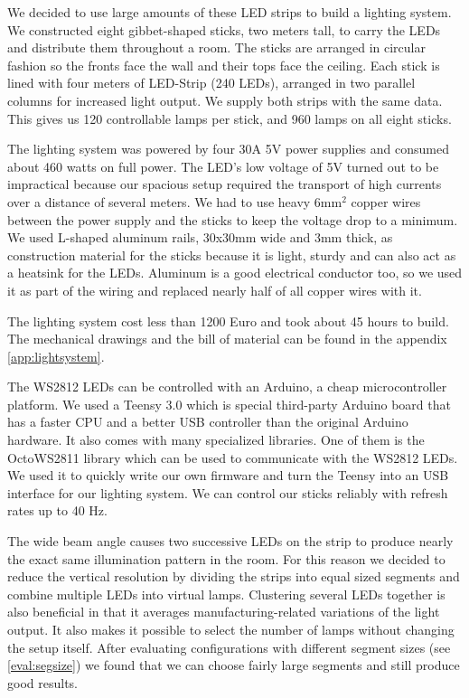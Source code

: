 We decided to use large amounts of these LED strips to build a lighting system.
We constructed eight gibbet-shaped sticks, two meters tall, to carry the LEDs and distribute them throughout a room.
The sticks are arranged in circular fashion so the fronts face the wall and their tops face the ceiling.
Each stick is lined with four meters of LED-Strip (240 LEDs), arranged in two parallel columns for increased light output.
We supply both strips with the same data. This gives us 120 controllable lamps per stick, and 960 lamps on all eight sticks.

The lighting system was powered by four 30A 5V power supplies and consumed about 460 watts on full power. 
The LED's low voltage of 5V turned out to be impractical because our spacious setup required the transport of high currents over a distance of several meters.
We had to use heavy 6mm$^2$ copper wires between the power supply and the sticks to keep the voltage drop to a minimum.
We used L-shaped aluminum rails, 30x30mm wide and 3mm thick, as construction material for the sticks because it is light, sturdy and can also act as a heatsink for the LEDs.
Aluminum is a good electrical conductor too, so we used it as part of the wiring and replaced nearly half of all copper wires with it.

The lighting system cost less than 1200 Euro and took about 45 hours to build.
The mechanical drawings and the bill of material can be found in the appendix \ref{app:lightsystem}.

The WS2812 LEDs can be controlled with an Arduino, a cheap microcontroller platform.
We used a Teensy 3.0 \cite{TEENSY} which is special third-party Arduino board that has a faster CPU and a better USB controller than the original Arduino hardware.
It also comes with many specialized libraries. One of them is the OctoWS2811 library \cite{OCTO} which can be used to communicate with the WS2812 LEDs.
We used it to quickly write our own firmware and turn the Teensy into an USB interface for our lighting system.
We can control our sticks reliably with refresh rates up to 40 Hz.

The wide beam angle causes two successive LEDs on the strip to produce nearly the exact same illumination pattern in the room.
For this reason we decided to reduce the vertical resolution by dividing the strips into equal sized segments and combine multiple LEDs into virtual lamps.
Clustering several LEDs together is also beneficial in that it averages manufacturing-related variations of the light output.
It also makes it possible to select the number of lamps without changing the setup itself.
After evaluating configurations with different segment sizes (see \ref{eval:segsize}) we found that we can choose fairly large segments and still produce good results.

